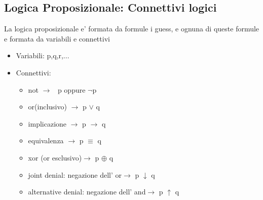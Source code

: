 \documentclass{article}
\begin{document}
    \subsection{Logica Proposizionale: Connettivi logici}
    \begin{flushleft}
     La logica proposizionale e' formata da formule i guess, e ognuna di queste formule e formata da variabili e connettivi
     \begin{itemize}
        \item Variabili: p,q,r,...
        \item Connettivi: \begin{itemize}
            \item not $\rightarrow$ ~p oppure $\neg$p%
            \item or(inclusivo) $\rightarrow$ p $\lor$ q%
            \item implicazione $\rightarrow$ p $\to$ q %
            \item equivalenza $\rightarrow$ p $\equiv$ q %
            \item xor (or esclusivo)$\rightarrow$ p $\oplus$ q %
            \item joint denial: negazione dell' or$\rightarrow$ p $\downarrow$ q %
            \item alternative denial: negazione dell' and$\rightarrow$ p $\uparrow$ q %
        \end{itemize}
     \end{itemize}

\end{flushleft}
\end{document}
